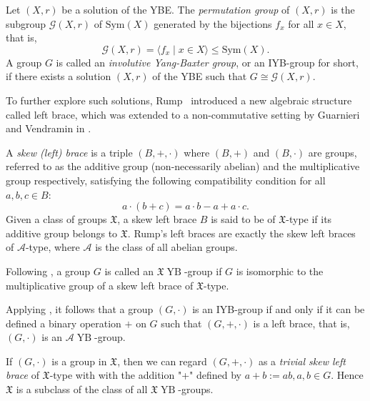 \documentclass[12pt,a4paper]{article}
\DeclareMathOperator{\YB}{YB}
\theoremstyle{definition}
\begin{document}
Let \((X, r)\) be a solution of the YBE. The \emph{permutation group} of \((X, r)\) is the subgroup \(\mathcal{G}(X, r)\) of \(\text{Sym}(X)\) generated by the bijections \( f_x \) for all \( x \in X \), that is,
\[
\mathcal{G}(X, r) = \langle f_x \mid x \in X \rangle \leq \text{Sym}(X).
\]
A group \( G \) is called an \emph{involutive Yang-Baxter group}, or an IYB-group for short, if there exists a solution \((X, r)\) of the YBE such that \( G \cong \mathcal{G}(X, r) \).


To further explore such solutions, Rump~\cite{Rump2007} introduced a new algebraic structure called left brace, which was extended to a non-commutative setting by Guarnieri and Vendramin in \cite{GuarnieriVendramin2017}.

A \emph{skew (left) brace} is a triple \((B, +, \cdot)\) where \((B, +)\) and \((B, \cdot)\) are groups, referred to as the additive group (non-necessarily abelian) and the multiplicative group respectively, satisfying the following compatibility condition for all \(a, b, c \in B\):
\[
a \cdot (b + c) = a \cdot b - a + a \cdot c.
\]
Given a class of groups $\mathfrak{X}$, a skew left brace \(B\) is said to be of $\mathfrak{X}$-type if its additive group belongs to $\mathfrak{X}$. Rump's left braces are exactly the skew left braces of $\mathcal{A}$-type, where $\mathcal{A}$ is the class of all abelian groups. 


Following \cite{BEJP2023}, a group $G$ is called an $\mathfrak{X}\YB$-group if $G$ is isomorphic to the multiplicative group of a skew left brace of $\mathfrak{X}$-type. 

Applying \cite[Theorem~2.1]{CedoJespersRio2010}, it follows that a group $(G, \cdot)$ is an IYB-group if and only if it can be defined a binary operation $+$ on $G$ such that $(G,+,\cdot)$ is a left brace, that is, $(G, \cdot)$ is an $\mathcal{A}\YB$-group.


If $(G,\cdot)$ is a group in $\mathfrak{X}$, then we can regard $(G,+, \cdot)$ as a \emph{trivial skew left brace} of  $\mathfrak{X}$-type with with the addition "+" defined by $a+b:=ab, a,b \in G.$ Hence $\mathfrak{X}$ is a subclass of the class of all $\mathfrak{X}\YB$-groups.


\end{document}

